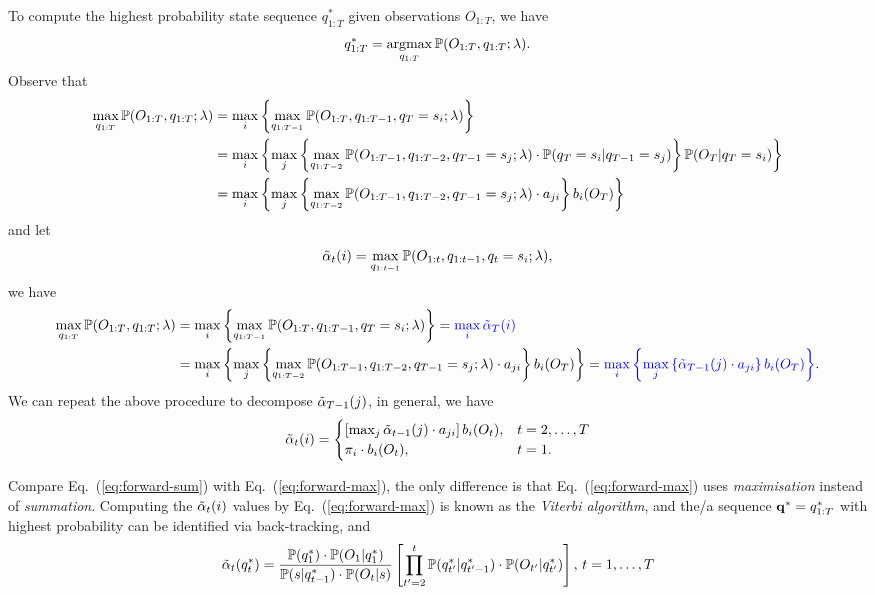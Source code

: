 To compute the highest probability state sequence $q_{1:T}^*$ given observations $O_{1:T}$, we have
\begin{equation*}
q_{1:T}^* = \operatorname*{argmax}_{q_{1:T}} \mathbb{P}(O_{1:T}, q_{1:T} ;\lambda).
\end{equation*}
Observe that 
\begin{align*}
\max_{q_{1:T}} \mathbb{P}(O_{1:T}, q_{1:T} ;\lambda) 
&= \max_{i} \left\{ \max_{q_{1:T-1}} \mathbb{P}(O_{1:T}, q_{1:T-1}, q_T = s_i ;\lambda) \right\} \\
&= \max_{i} \left\{ \max_{j} \left\{ \max_{q_{1:T-2}} \mathbb{P}(O_{1:T-1}, q_{1:T-2}, q_{T-1} = s_j ;\lambda) \cdot 
   \mathbb{P}(q_T = s_i |q_{T-1} = s_j) \right\} \mathbb{P}(O_T |q_T = s_i) \right\} \\
&= \max_{i} \left\{ \max_{j} \left\{ \max_{q_{1:T-2}} \mathbb{P}(O_{1:T-1}, q_{1:T-2}, q_{T-1} = s_j ;\lambda) \cdot a_{ji} \right\} b_i(O_T) \right\}
\end{align*}
and let 
\begin{equation}
\label{eq:alphat}
\tilde{\alpha}_{t}(i) = \max_{q_{1:t-1}} \mathbb{P}(O_{1:t}, q_{1:t-1}, q_t = s_i ;\lambda),
\end{equation}
we have
\begin{alignat}{2}
\max_{q_{1:T}} \mathbb{P}(O_{1:T}, q_{1:T} ;\lambda) 
&= \max_{i} \left\{ \max_{q_{1:T-1}} \mathbb{P}(O_{1:T}, q_{1:T-1}, q_T = s_i ;\lambda) \right\} 
 = {\color{blue}{\max_{i} \tilde{\alpha}_{T}(i)}} \label{eq:max-forward} \\
&= \max_{i} \left\{ \max_{j} \left\{ \max_{q_{1:T-2}} \mathbb{P}(O_{1:T-1}, q_{1:T-2}, q_{T-1} = s_j ;\lambda) \cdot a_{ji} \right\} b_i(O_T) \right\}
 = {\color{blue}{\max_{i} \left\{ \max_{j} \left\{ \tilde{\alpha}_{T-1}(j) \cdot a_{ji} \right\} b_i(O_T) \right\}}}. \nonumber
\end{alignat}
We can repeat the above procedure to decompose $\tilde{\alpha}_{T-1}(j)$, in general, we have
\begin{equation}
\label{eq:forward-max}
\tilde{\alpha}_t(i) = \begin{cases}
                \left[ \max_{j} \tilde{\alpha}_{t-1}(j) \cdot a_{ji} \right] b_i(O_t), & t=2,\dots,T \\
                \pi_i \cdot b_i(O_t), & t=1.
               \end{cases}
\end{equation}

Compare Eq.~(\ref{eq:forward-sum}) with Eq.~(\ref{eq:forward-max}), 
the only difference is that Eq.~(\ref{eq:forward-max}) uses \emph{maximisation} instead of \emph{summation}.
Computing the $\tilde{\alpha}_t(i)$ values by Eq.~(\ref{eq:forward-max}) is known as the \emph{Viterbi algorithm}, 
and the/a sequence $\mathbf{q}^* = q_{1:T}^*$ with highest probability can be identified via back-tracking, and
\begin{equation}
\label{eq:alpha-sum}
\tilde{\alpha}_t(q_t^*) = \frac{\mathbb{P}(q_1^*) \cdot \mathbb{P}(O_1 |q_1^*)} {\mathbb{P}(s |q_{t-1}^*) \cdot \mathbb{P}(O_t |s)} \left[ \prod_{t'=2}^t \mathbb{P}(q_{t'}^* |q_{t'-1}^*) \cdot \mathbb{P}(O_{t'} |q_{t'}^*) \right], \, t = 1,\dots,T
\end{equation}

